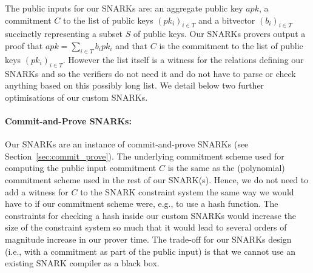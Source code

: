\vspace{-0.05cm}
\noindent The public inputs for our SNARKs are: an aggregate public key $\mathit{apk}$, a commitment $C$ to the list of
public keys $(pk_i)_{i \in T}$ and a bitvector $(b_i)_{i \in T}$ succinctly representing a subset $S$ of public keys.
Our SNARKs provers output a proof that $apk=\sum_{i \in T} b_i pk_i$ and that $C$ is the commitment to the list of public keys
$(pk_i)_{i \in T}$. However the list itself is a witness for the relations defining our SNARKs and so the verifiers do not need it
and do not have to parse or check anything based on this possibly long list.
We detail below two further optimisations of our custom SNARKs.

\vspace{-0.05in}
\paragraph{Commit-and-Prove SNARKs:} Our SNARKs are an instance of commit-and-prove SNARKs (see Section~\ref{sec:commit_prove}).
The underlying commitment scheme used for computing the public input commitment $C$ is the same as the (polynomial) commitment scheme used in the rest of our SNARK(s). 
Hence, we do not need to add a witness for $C$ to the SNARK constraint system the same way we would have to if our commitment scheme were, e.g., to use a hash function.
The constraints for checking a hash inside our custom SNARKs would increase the size of the constraint system so much that it would lead to several orders of magnitude 
increase in our prover time. The trade-off for our SNARKs design (i.e., with a commitment as part of the public input) is that we cannot use an existing SNARK compiler as a black box.

